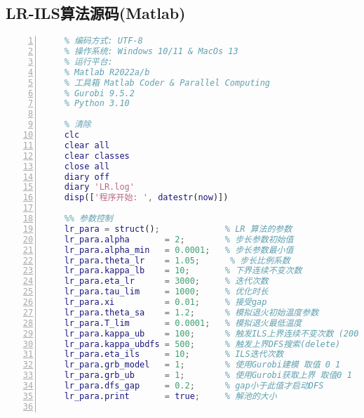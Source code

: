 \subsection*{LR-ILS算法源码(Matlab)}
\vspace{-20pt}
\small{
    \begin{lstlisting}[language=Matlab,
        breaklines=true, % 自动换行
        frame = leftline,
        linewidth = \textwidth,
        texcl = false,
        columns=flexible,
        lineskip=1pt,
        keywordstyle=\color{blue!90}\bfseries, %代码关键字的颜色为蓝色，粗体
        numbers=left,%左侧显示行号
        numberstyle=\small, %行号字体用小号
        showspaces=false, %
        fontadjust,
        basicstyle = \fontspec{Times New Roman},
        basicstyle = \songti
        ]
    % 拉格朗日松弛求解可靠设施选址问题(RUFL)
    % 编码方式: UTF-8
    % 操作系统: Windows 10/11 & MacOs 13
    % 运行平台:
    % Matlab R2022a/b 
    % 工具箱 Matlab Coder & Parallel Computing
    % Gurobi 9.5.2
    % Python 3.10

    % 清除
    clc
    clear all
    clear classes
    close all 
    diary off
    diary 'LR.log'
    disp(['程序开始: ', datestr(now)])

    %% 参数控制
    lr_para = struct();             % LR 算法的参数
    lr_para.alpha       = 2;        % 步长参数初始值
    lr_para.alpha_min   = 0.0001;   % 步长参数最小值
    lr_para.theta_lr    = 1.05;      % 步长比例系数
    lr_para.kappa_lb    = 10;       % 下界连续不变次数
    lr_para.eta_lr      = 3000;     % 迭代次数
    lr_para.tau_lim     = 1000;     % 优化时长
    lr_para.xi          = 0.01;     % 接受gap
    lr_para.theta_sa    = 1.2;      % 模拟退火初始温度参数
    lr_para.T_lim       = 0.0001;   % 模拟退火最低温度
    lr_para.kappa_ub    = 100;      % 触发ILS上界连续不变次数 (200)
    lr_para.kappa_ubdfs = 500;      % 触发上界DFS搜索(delete)
    lr_para.eta_ils     = 10;       % ILS迭代次数
    lr_para.grb_model   = 1;        % 使用Gurobi建模 取值 0 1
    lr_para.grb_ub      = 1;        % 使用Gurobi获取上界 取值0 1
    lr_para.dfs_gap     = 0.2;      % gap小于此值才启动DFS
    lr_para.print       = true;     % 解池的大小


\end{lstlisting}}
